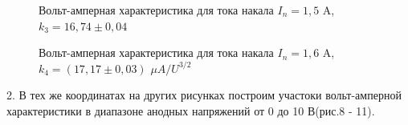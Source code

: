 \documentclass[a4paper,12pt]{article}
\begin{document}
\begin{figure} 
	\centering
	\caption{Вольт-амперная характеристика для тока накала $I_n = 1,5$ A, $k_3 = 16,74 \pm 0,04$}
	\label{mah}
\end{figure}

\begin{figure} 
	\centering
	\caption{Вольт-амперная характеристика для тока накала $I_n = 1,6$ A, $k_4 = (17,17 \pm 0,03)$ $\mu A/U^{3/2}$}
	\label{mah}
\end{figure}

\par 2. В тех же координатах на других рисунках построим участоки вольт-амперной характеристики в диапазоне анодных напряжений от 0 до 10 В(рис.8 - 11). 
\end{document}
